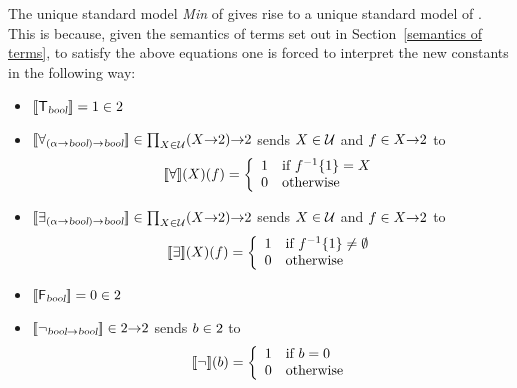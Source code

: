 The unique standard model {\em Min\/} of  gives rise to a
unique standard model of
. This is
because, given the semantics of terms set out in
Section~\ref{semantics of terms}, to satisfy the above equations one
is forced to interpret the new constants in the following way:
\begin{itemize}

\item $\den{\T_{\bool}}\index{T@\holtxt{T}!formal semantics of} = 1 \in \two$

\item {}
$[\![\forall_{(\alpha{\to}\textsl{bool}){\to}\textsl{bool}}]\!]\in\prod_{X\in{\cal
 U}}(X{\to}\mbox{\rm 2}){\to}\mbox{\rm 2}$ sends $X\in{\cal U}$ and $f\in X{\to}\mbox{\rm 2}$ to
\[
[\![\forall]\!](X)(f) = \left\{ \begin{array}{ll} 1 & \mbox{if
$f^{-1}\{1\}=X$} \\ 0 & \mbox{otherwise} \end{array} \right.
\]

\item {}
$[\![\exists_{(\alpha{\to}\textsl{bool}){\to}\textsl{bool}}]\!]\in\prod_{X\in{\cal
 U}}(X{\to}\mbox{\rm 2}){\to}\mbox{\rm 2}$ sends $X\in{\cal U}$ and $f\in X{\to}\mbox{\rm 2}$ to
\[
[\![\exists]\!](X)(f) = \left\{ \begin{array}{ll}
                                   1 & \mbox{if $f^{-1}\{1\}\not=\emptyset$} \\
                                   0 & \mbox{otherwise}
                                  \end{array}
                          \right. \]

\item $[\![{\sf F}_{\textsl{bool}}]\!] = 0 \in \mbox{\rm 2}$

\item $[\![\neg_{\textsl{bool}{\to}\textsl{bool}}]\!]\in\mbox{\rm 2}{\to}\mbox{\rm 2}$ sends $b\in\mbox{\rm 2}$ to
 \[ [\![\neg]\!](b) = \left\{ \begin{array}{ll}
                             1 & \mbox{if $b=0$} \\
                             0 & \mbox{otherwise}
                            \end{array}
                    \right. \]


\end{itemize}
